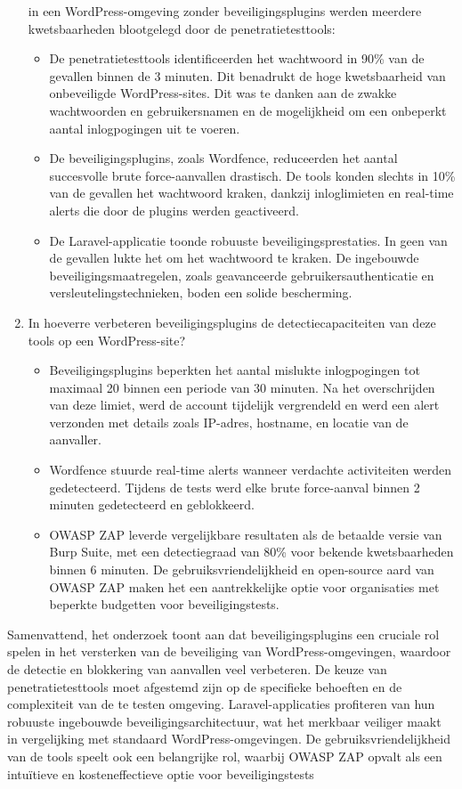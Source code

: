 \begin{enumerate}
  in een WordPress-omgeving zonder beveiligingsplugins werden meerdere kwetsbaarheden blootgelegd door de penetratietesttools:
  \begin{itemize}
    \item De penetratietesttools identificeerden het wachtwoord in 90\% van de gevallen binnen de 3 minuten. Dit benadrukt de 
    hoge kwetsbaarheid van onbeveiligde WordPress-sites. Dit was te danken aan de zwakke wachtwoorden en gebruikersnamen en 
    de mogelijkheid om een onbeperkt aantal inlogpogingen uit te voeren.
    \item De beveiligingsplugins, zoals Wordfence, reduceerden het aantal succesvolle brute force-aanvallen drastisch. 
    De tools konden slechts in 10\% van de gevallen het wachtwoord kraken, dankzij inloglimieten en 
    real-time alerts die door de plugins werden geactiveerd.
    \item De Laravel-applicatie toonde robuuste beveiligingsprestaties. In geen van de gevallen lukte het om het wachtwoord 
    te kraken. De ingebouwde beveiligingsmaatregelen, zoals geavanceerde gebruikersauthenticatie en 
    versleutelingstechnieken, boden een solide bescherming.
  \end{itemize}
  \item In hoeverre verbeteren beveiligingsplugins de detectiecapaciteiten van deze tools op een WordPress-site?
  \begin{itemize}
    \item Beveiligingsplugins beperkten het aantal mislukte inlogpogingen tot maximaal 20 binnen een periode van 
    30 minuten. Na het overschrijden van deze limiet, werd de account tijdelijk vergrendeld en werd een alert 
    verzonden met details zoals IP-adres, hostname, en locatie van de aanvaller.
    \item Wordfence stuurde real-time alerts wanneer verdachte activiteiten werden gedetecteerd. Tijdens de 
    tests werd elke brute force-aanval binnen 2 minuten gedetecteerd en geblokkeerd.
    \item OWASP ZAP leverde vergelijkbare resultaten als de betaalde versie van Burp Suite, met een detectiegraad van 80\% 
    voor bekende kwetsbaarheden binnen 6 minuten. De gebruiksvriendelijkheid en open-source aard van OWASP ZAP maken het een 
    aantrekkelijke optie voor organisaties met beperkte budgetten voor beveiligingstests.
  \end{itemize}
\end{enumerate}

Samenvattend, het onderzoek toont aan dat beveiligingsplugins een cruciale rol spelen in het versterken van de 
beveiliging van WordPress-omgevingen, waardoor de detectie en blokkering van aanvallen veel verbeteren. 
De keuze van penetratietesttools moet afgestemd zijn op de specifieke behoeften en de complexiteit van de te 
testen omgeving. Laravel-applicaties profiteren van hun robuuste ingebouwde beveiligingsarchitectuur, wat het 
merkbaar veiliger maakt in vergelijking met standaard WordPress-omgevingen. De gebruiksvriendelijkheid van de 
tools speelt ook een belangrijke rol, waarbij OWASP ZAP opvalt als een intuïtieve en kosteneffectieve optie 
voor beveiligingstests
